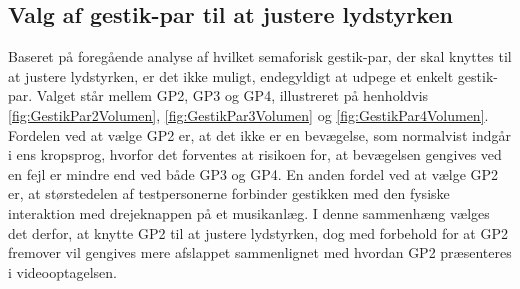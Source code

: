 \subsection{Valg af gestik-par til at justere lydstyrken}
\label{TestresultaterValgAfGestikkerValgVolumen}
%
Baseret på foregående analyse af hvilket semaforisk gestik-par, der skal knyttes til at justere lydstyrken, er det ikke muligt, endegyldigt at udpege et enkelt gestik-par. Valget står mellem GP2, GP3 og GP4, illustreret på henholdvis \autoref{fig:GestikPar2Volumen}, \autoref{fig:GestikPar3Volumen} og \autoref{fig:GestikPar4Volumen}. Fordelen ved at vælge GP2 er, at det ikke er en bevægelse, som normalvist indgår i ens kropsprog, hvorfor det forventes at risikoen for, at bevægelsen gengives ved en fejl er mindre end ved både GP3 og GP4. En anden fordel ved at vælge GP2 er, at størstedelen af testpersonerne forbinder gestikken med den fysiske interaktion med drejeknappen på et musikanlæg. I denne sammenhæng vælges det derfor, at knytte GP2 til at justere lydstyrken, dog med forbehold for at GP2 fremover vil gengives mere afslappet sammenlignet med hvordan GP2 præsenteres i videooptagelsen.    

